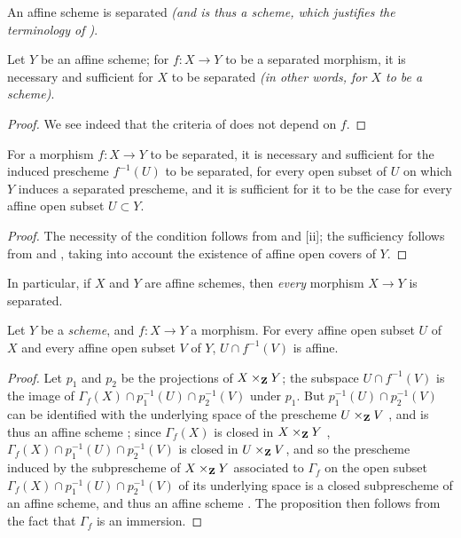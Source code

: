 \begin{cor}[5.5.7]
\label{1.5.5.7}
An affine scheme is separated \emph{(and is thus a \emph{scheme}, which justifies the terminology of )}.
\end{cor}

\begin{cor}[5.5.8]
\label{1.5.5.8}
Let $Y$ be an affine scheme;
for $f:X\to Y$ to be a separated morphism, it is necessary and sufficient for $X$ to be separated \emph{(in other words, for $X$ to be a \emph{scheme})}.
\end{cor}

\begin{proof}
\label{proof-1.5.5.8}
We see indeed that the criteria of  does not depend on $f$.
\end{proof}

\begin{cor}[5.5.9]
\label{1.5.5.9}
For a morphism $f:X\to Y$ to be separated, it is necessary and sufficient for the induced prescheme $f^{-1}(U)$ to be separated, for every open subset of $U$ on which $Y$ induces a separated prescheme, and it is sufficient for it to be the case for every affine open subset $U\subset Y$.
\end{cor}

\begin{proof}
\label{proof-1.5.5.9}
The necessity of the condition follows from  and [ii];
the sufficiency follows from  and , taking into account the existence of affine open covers of $Y$.
\end{proof}

In particular, if $X$ and $Y$ are affine schemes, then \emph{every} morphism $X\to Y$ is separated.

\begin{prop}[5.5.10]
\label{1.5.5.10}
Let $Y$ be a \emph{scheme}, and $f:X\to Y$ a morphism.
For every affine open subset $U$ of $X$ and every affine open subset $V$ of $Y$, $U\cap f^{-1}(V)$ is affine.
\end{prop}

\begin{proof}
\label{proof-1.5.5.10}
Let $p_1$ and $p_2$ be the projections of $X\times_\mathbf{Z} Y$;
the subspace $U\cap f^{-1}(V)$ is the image of $\Gamma_f(X)\cap p_1^{-1}(U)\cap p_2^{-1}(V)$ under $p_1$.
But $p_1^{-1}(U)\cap p_2^{-1}(V)$ can be identified with the underlying space of the
prescheme $U\times_\mathbf{Z} V$ , and is thus an affine scheme ;
since $\Gamma_f(X)$ is closed in $X\times_\mathbf{Z} Y$ , $\Gamma_f(X)\cap p_1^{-1}(U)\cap p_2^{-1}(V)$ is closed in $U\times_\mathbf{Z} V$, and so the prescheme induced by the subprescheme of $X\times_\mathbf{Z} Y$ associated to $\Gamma_f$  on the open subset $\Gamma_f(X)\cap p_1^{-1}(U)\cap p_2^{-1}(V)$ of its underlying space is a closed subprescheme of an affine scheme, and thus an affine scheme .
The proposition then follows from the fact that $\Gamma_f$ is an immersion.
\end{proof}

